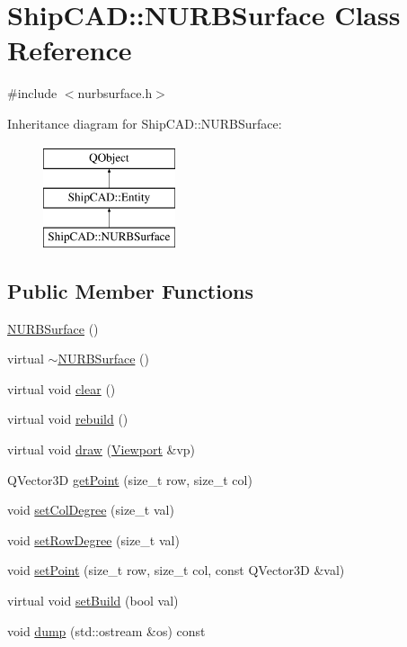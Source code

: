 \hypertarget{classShipCAD_1_1NURBSurface}{\section{Ship\-C\-A\-D\-:\-:N\-U\-R\-B\-Surface Class Reference}
\label{classShipCAD_1_1NURBSurface}
}


{\ttfamily \#include $<$nurbsurface.\-h$>$}

Inheritance diagram for Ship\-C\-A\-D\-:\-:N\-U\-R\-B\-Surface\-:\begin{figure}[H]
\begin{center}
\leavevmode
\includegraphics[height=3.000000cm]{classShipCAD_1_1NURBSurface}
\end{center}
\end{figure}
\subsection*{Public Member Functions}
\begin{DoxyCompactItemize}
\item 
\hyperlink{classShipCAD_1_1NURBSurface_ac01a08234a1d2a5e44d68a7393ef131c}{N\-U\-R\-B\-Surface} ()
\item 
virtual \hyperlink{classShipCAD_1_1NURBSurface_a333394fe5adc78a853d8784f4d2e87c6}{$\sim$\-N\-U\-R\-B\-Surface} ()
\item 
virtual void \hyperlink{classShipCAD_1_1NURBSurface_a5013b0c1e511ea68909eef5d0473d032}{clear} ()
\item 
virtual void \hyperlink{classShipCAD_1_1NURBSurface_a643231ea9a8f26e528a1d9a0dccf4070}{rebuild} ()
\item 
virtual void \hyperlink{classShipCAD_1_1NURBSurface_a9ee8f8aea431fe9f465080ec9f5624f9}{draw} (\hyperlink{classShipCAD_1_1Viewport}{Viewport} \&vp)
\item 
Q\-Vector3\-D \hyperlink{classShipCAD_1_1NURBSurface_a30435ae8689f09400b7754e4d7b3242a}{get\-Point} (size\-\_\-t row, size\-\_\-t col)
\item 
void \hyperlink{classShipCAD_1_1NURBSurface_a12217816f19b7de790ae9ed5cc784887}{set\-Col\-Degree} (size\-\_\-t val)
\item 
void \hyperlink{classShipCAD_1_1NURBSurface_a1f71f4cdf57f3f93aeaba0e7705d18f4}{set\-Row\-Degree} (size\-\_\-t val)
\item 
void \hyperlink{classShipCAD_1_1NURBSurface_aca43db0a1f829e101c4df124a4490031}{set\-Point} (size\-\_\-t row, size\-\_\-t col, const Q\-Vector3\-D \&val)
\item 
virtual void \hyperlink{classShipCAD_1_1NURBSurface_aa6fc3d060087593349ce1b5119419433}{set\-Build} (bool val)
\item 
void \hyperlink{classShipCAD_1_1NURBSurface_ad94a4350cda13ed3971ccf7bedaa1f10}{dump} (std\-::ostream \&os) const 
\end{DoxyCompactItemize}
